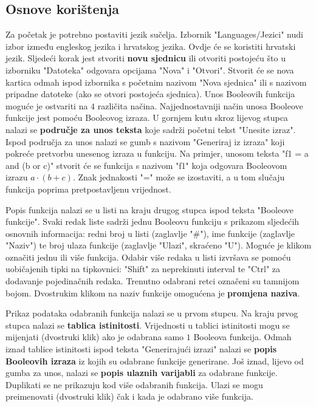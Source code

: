 \documentclass[times, utf8, diplomski]{fer}
\begin{document}
\subsection{Osnove korištenja} \label{subsec:osnove_koristenja}

Za početak je potrebno postaviti jezik sučelja. Izbornik "Languages/Jezici" nudi izbor između engleskog jezika i hrvatskog jezika. Ovdje će se koristiti hrvatski jezik. Sljedeći korak jest stvoriti \textbf{novu sjednicu} ili otvoriti postojeću što u izborniku "Datoteka" odgovara opcijama "Nova" i "Otvori". Stvorit će se nova kartica odmah ispod izbornika s početnim nazivom "Nova sjednica" ili s nazivom pripadne datoteke (ako se otvori postojeća sjednica). Unos Booleovih funkcija moguće je ostvariti na $4$ različita načina. Najjednostavniji način unosa Booleove funkcije jest pomoću Booleovog izraza. U gornjem kutu skroz lijevog stupca nalazi se \textbf{područje za unos teksta} koje sadrži početni tekst "Unesite izraz". Ispod područja za unos nalazi se gumb s nazivom "Generiraj iz izraza" koji pokreće pretvorbu unesenog izraza u funkciju. Na primjer, unosom teksta "f1 = a and (b or c)" stvorit će se funkcija s nazivom "f1" koja odgovara Booleovom izrazu $a \cdot (b + c)$. Znak jednakosti "=" može se izostaviti, a u tom slučaju funkcija poprima pretpostavljenu vrijednost.

Popis funkcija nalazi se u listi na kraju drugog stupca ispod teksta "Booleove funkcije". Svaki redak liste sadrži jednu Booleovu funkciju s prikazom sljedećih osnovnih informacija: redni broj u listi (zaglavlje "\#"), ime funkcije (zaglavlje "Naziv") te broj ulaza funkcije (zaglavlje "Ulazi", skraćeno "U"). Moguće je klikom označiti jednu ili više funkcija. Odabir više redaka u listi izvršava se pomoću uobičajenih tipki na tipkovnici: "Shift" za neprekinuti interval te "Ctrl" za dodavanje pojedinačnih redaka. Trenutno odabrani retci označeni su tamnijom bojom. Dvostrukim klikom na naziv funkcije omogućena je \textbf{promjena naziva}.

Prikaz podataka odabranih funkcija nalazi se u prvom stupcu. Na kraju prvog stupca nalazi se \textbf{tablica istinitosti}. Vrijednosti u tablici istinitosti mogu se mijenjati (dvostruki klik) ako je odabrana samo $1$ Booleova funkcija. Odmah iznad tablice istinitosti ispod teksta "Generirajući izrazi" nalazi se \textbf{popis Booleovih izraza} iz kojih su odabrane funkcije generirane. Još iznad, lijevo od gumba za unos, nalazi se \textbf{popis ulaznih varijabli} za odabrane funkcije. Duplikati se ne prikazuju kod više odabranih funkcija. Ulazi se mogu preimenovati (dvostruki klik) čak i kada je odabrano više funkcija.
\end{document}
